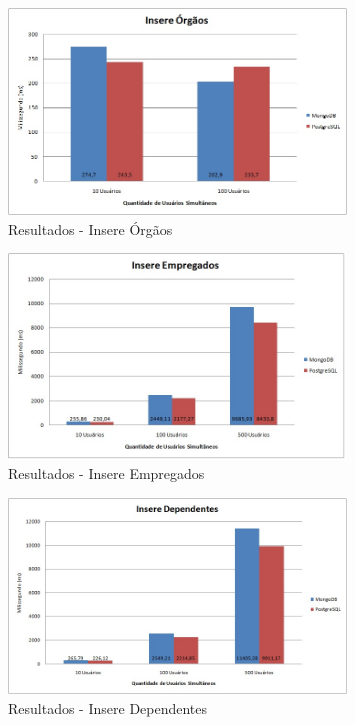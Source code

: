 \begin{figure}[!htbp]
	\begin{center}
		\includegraphics[width=0.8\textwidth]{resultados/insere_orgaos}
	\end{center}
	\caption{Resultados - Insere Órgãos}
	\label{fig:resultinsereorgaos}
\end{figure}

\begin{figure}[!htbp]
	\begin{center}
		\includegraphics[width=0.8\textwidth]{resultados/insere_empregados}
	\end{center}
	\caption{Resultados - Insere Empregados}
	\label{fig:resultinsereempregados}
\end{figure}

\begin{figure}[!htbp]
	\begin{center}
		\includegraphics[width=0.8\textwidth]{resultados/insere_dependentes}
	\end{center}
	\caption{Resultados - Insere Dependentes}
	\label{fig:resultinseredependentes}
\end{figure}

